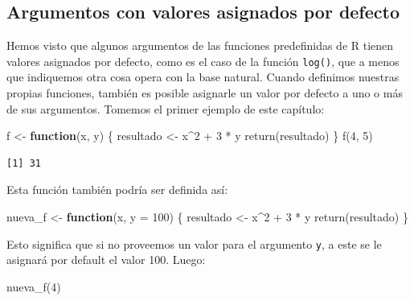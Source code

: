 \documentclass[
]{book}
\newenvironment{Shaded}{\begin{snugshade}}{\end{snugshade}}
\newcommand{\AttributeTok}[1]{\textcolor[rgb]{0.77,0.63,0.00}{#1}}
\newcommand{\ControlFlowTok}[1]{\textcolor[rgb]{0.13,0.29,0.53}{\textbf{#1}}}
\newcommand{\DecValTok}[1]{\textcolor[rgb]{0.00,0.00,0.81}{#1}}
\newcommand{\FunctionTok}[1]{\textcolor[rgb]{0.00,0.00,0.00}{#1}}
\newcommand{\NormalTok}[1]{#1}
\newcommand{\OtherTok}[1]{\textcolor[rgb]{0.56,0.35,0.01}{#1}}
\newcommand{\SpecialCharTok}[1]{\textcolor[rgb]{0.00,0.00,0.00}{#1}}
\begin{document}
\hypertarget{argumentos-con-valores-asignados-por-defecto}{%
\subsection{Argumentos con valores asignados por defecto}\label{argumentos-con-valores-asignados-por-defecto}}

Hemos visto que algunos argumentos de las funciones predefinidas de R tienen valores asignados por defecto, como es el caso de la función \texttt{log()}, que a menos que indiquemos otra cosa opera con la base natural. Cuando definimos nuestras propias funciones, también es posible asignarle un valor por defecto a uno o más de sus argumentos.
Tomemos el primer ejemplo de este capítulo:

\begin{Shaded}
\begin{Highlighting}[]
\NormalTok{f }\OtherTok{\textless{}{-}} \ControlFlowTok{function}\NormalTok{(x, y) \{}
\NormalTok{    resultado }\OtherTok{\textless{}{-}}\NormalTok{ x}\SpecialCharTok{\^{}}\DecValTok{2} \SpecialCharTok{+} \DecValTok{3} \SpecialCharTok{*}\NormalTok{ y}
    \FunctionTok{return}\NormalTok{(resultado)}
\NormalTok{\}}
\FunctionTok{f}\NormalTok{(}\DecValTok{4}\NormalTok{, }\DecValTok{5}\NormalTok{)}
\end{Highlighting}
\end{Shaded}

\begin{verbatim}
[1] 31
\end{verbatim}

Esta función también podría ser definida así:

\begin{Shaded}
\begin{Highlighting}[]
\NormalTok{nueva\_f }\OtherTok{\textless{}{-}} \ControlFlowTok{function}\NormalTok{(x, }\AttributeTok{y =} \DecValTok{100}\NormalTok{) \{}
\NormalTok{    resultado }\OtherTok{\textless{}{-}}\NormalTok{ x}\SpecialCharTok{\^{}}\DecValTok{2} \SpecialCharTok{+} \DecValTok{3} \SpecialCharTok{*}\NormalTok{ y}
    \FunctionTok{return}\NormalTok{(resultado)}
\NormalTok{\}}
\end{Highlighting}
\end{Shaded}

Esto significa que si no proveemos un valor para el argumento \texttt{y}, a este se le asignará por default el valor 100. Luego:

\begin{Shaded}
\begin{Highlighting}[]
\FunctionTok{nueva\_f}\NormalTok{(}\DecValTok{4}\NormalTok{)}
\end{Highlighting}
\end{Shaded}
\end{document}
